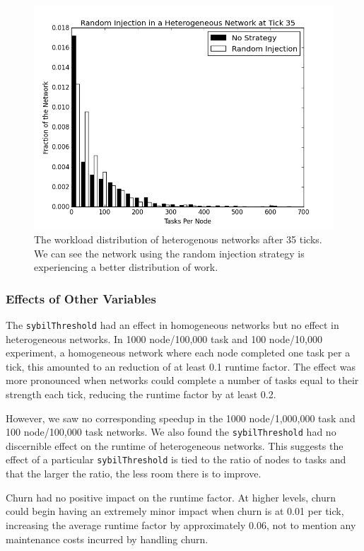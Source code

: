 \documentclass[11pt,conference]{IEEEtran}
\begin{document}
{	
	\begin{figure}
		\centering
		\includegraphics[width=0.7\linewidth]{figs/randomStableHistHetero35}
		\caption[Random injection in a Heterogenous Network]{The workload distribution of heterogenous networks after 35 ticks.  We can see the network using the random injection strategy is experiencing a better distribution of work.}
		\label{fig:randomStableHistHetero35}
	\end{figure}
	
	
	
	\subsubsection{Effects of Other Variables}
	
	The \texttt{sybilThreshold} had an effect in homogeneous networks but no effect in heterogeneous networks.
	In 1000 node/100,000 task and 100 node/10,000 experiment, a homogeneous network where each node completed one task per a tick, this amounted to an reduction of at least 0.1 runtime factor.
	The effect was more pronounced when networks could complete a number of tasks equal to their strength each tick, reducing the runtime factor by at least 0.2.
	
	However, we saw no corresponding speedup in the 1000 node/1,000,000 task and 100 node/100,000 task networks.
	We also found the \texttt{sybilThreshold} had no discernible effect on the runtime of heterogeneous networks.
	This suggests the effect of a particular \texttt{sybilThreshold} is tied to the ratio of nodes to tasks and that the larger the ratio, the less room there is to improve.
	
	Churn had no positive impact on the runtime factor.
	At higher levels, churn could begin having an extremely minor impact when churn is at 0.01 per tick, increasing the average runtime factor by approximately 0.06, not to mention any maintenance costs incurred by handling churn.
	
}
\end{document}

